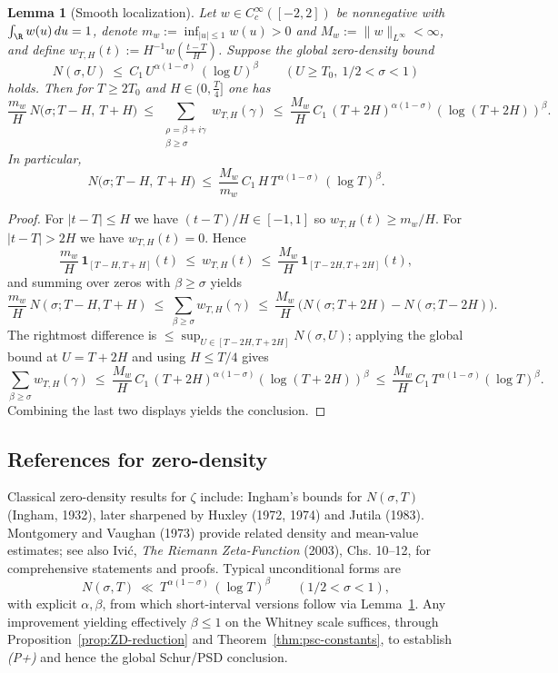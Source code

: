 \documentclass[11pt]{article}
\newtheorem{lemma}[theorem]{Lemma}
\theoremstyle{remark}
\begin{document}
\begin{lemma}[Smooth localization]\label{lem:ZD-localization}
Let $w\in C_c^\infty([-2,2])$ be nonnegative with $\int_\R w(u)\,du=1$, denote $m_w:=\inf_{|u|\le 1}w(u)>0$ and $M_w:=\|w\|_{L^\infty}<\infty$, and define $w_{T,H}(t):=H^{-1}w(\tfrac{t-T}{H})$.
Suppose the global zero-density bound
\[
  N(\sigma,U)\ \le\ C_1\,U^{\alpha(1-\sigma)}\,(\log U)^{\beta}\qquad (U\ge T_0,\ 1/2<\sigma<1)
\]
holds. Then for $T\ge 2T_0$ and $H\in(0,\tfrac{T}{4}]$ one has
\[
  \frac{m_w}{H}\,N\big(\sigma;T-H,\,T+H\big)\ \le\ \sum_{\substack{\rho=\beta+i\gamma\\ \beta\ge \sigma}} w_{T,H}(\gamma)\ \le\ \frac{M_w}{H}\,C_1\,(T+2H)^{\alpha(1-\sigma)}(\log(T+2H))^{\beta}.
\]
In particular,
\[
  N\big(\sigma;T-H,\,T+H\big)\ \le\ \frac{M_w}{m_w}\,C_1\,H\,T^{\alpha(1-\sigma)}\,(\log T)^{\beta}.
\]
\end{lemma}
\begin{proof}
For $|t-T|\le H$ we have $(t-T)/H\in[-1,1]$ so $w_{T,H}(t)\ge m_w/H$. For $|t-T|>2H$ we have $w_{T,H}(t)=0$. Hence
\[
  \frac{m_w}{H}\,\mathbf{1}_{[T-H,T+H]}(t)\ \le\ w_{T,H}(t)\ \le\ \frac{M_w}{H}\,\mathbf{1}_{[T-2H,T+2H]}(t),
\]
and summing over zeros with $\beta\ge\sigma$ yields
\[
  \frac{m_w}{H}\,N(\sigma;T-H,T+H)\ \le\ \sum_{\beta\ge\sigma} w_{T,H}(\gamma)\ \le\ \frac{M_w}{H}\,\Big(N(\sigma;T+2H)-N(\sigma;T-2H)\Big).
\]
The rightmost difference is $\le \sup_{U\in[T-2H,T+2H]} N(\sigma,U)$; applying the global bound at $U=T+2H$ and using $H\le T/4$ gives
\[
  \sum_{\beta\ge\sigma} w_{T,H}(\gamma)\ \le\ \frac{M_w}{H}\,C_1\,(T+2H)^{\alpha(1-\sigma)}(\log(T+2H))^{\beta}
  \ \le\ \frac{M_w}{H}\,C_1\,T^{\alpha(1-\sigma)}(\log T)^{\beta}.
\]
Combining the last two displays yields the conclusion.\qedhere
\end{proof}

\subsection{References for zero-density}\label{subsec:ZD-refs}
Classical zero-density results for \(\zeta\) include: Ingham’s bounds for \(N(\sigma,T)\) (Ingham, 1932), later sharpened by Huxley (1972, 1974) and Jutila (1983). Montgomery and Vaughan (1973) provide related density and mean-value estimates; see also Ivi\'c, \emph{The Riemann Zeta-Function} (2003), Chs. 10–12, for comprehensive statements and proofs. Typical unconditional forms are
\[
 N(\sigma,T)\ \ll\ T^{\alpha(1-\sigma)}\,(\log T)^{\beta}\qquad (1/2<\sigma<1),
\]
with explicit \(\alpha,\beta\), from which short-interval versions follow via Lemma~\ref{lem:ZD-localization}. Any improvement yielding effectively \(\beta\le 1\) on the Whitney scale suffices, through Proposition~\ref{prop:ZD-reduction} and Theorem~\ref{thm:psc-constants}, to establish \emph{(P+)} and hence the global Schur/PSD conclusion.
\end{document}
